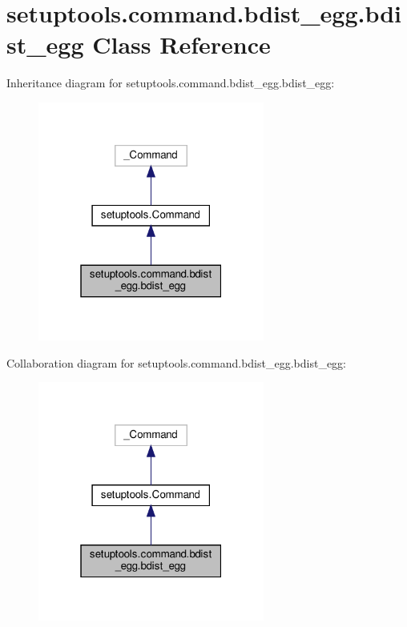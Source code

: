\hypertarget{classsetuptools_1_1command_1_1bdist__egg_1_1bdist__egg}{}\section{setuptools.\+command.\+bdist\+\_\+egg.\+bdist\+\_\+egg Class Reference}
\label{classsetuptools_1_1command_1_1bdist__egg_1_1bdist__egg}


Inheritance diagram for setuptools.\+command.\+bdist\+\_\+egg.\+bdist\+\_\+egg\+:
\nopagebreak
\begin{figure}[H]
\begin{center}
\leavevmode
\includegraphics[width=211pt]{classsetuptools_1_1command_1_1bdist__egg_1_1bdist__egg__inherit__graph}
\end{center}
\end{figure}


Collaboration diagram for setuptools.\+command.\+bdist\+\_\+egg.\+bdist\+\_\+egg\+:
\nopagebreak
\begin{figure}[H]
\begin{center}
\leavevmode
\includegraphics[width=211pt]{classsetuptools_1_1command_1_1bdist__egg_1_1bdist__egg__coll__graph}
\end{center}
\end{figure}
